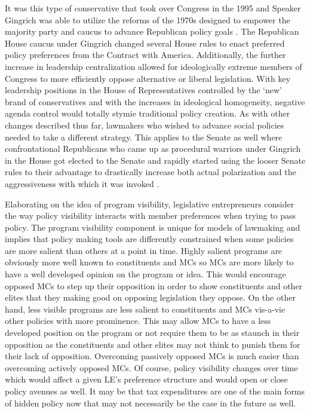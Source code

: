 \documentclass[12pt]{article}
\begin{document}
It was this type of conservative that took over Congress in the 1995 and Speaker Gingrich was able to utilize the reforms of the 1970s designed to empower the majority party and caucus to advance Republican policy goals \citep{roberts2003}. The Republican House caucus under Gingrich changed several House rules to enact preferred policy preferences from the Contract with America. Additionally, the further increase in leadership centralization allowed for ideologically extreme members of Congress to more efficiently oppose alternative or liberal legislation. With key leadership positions in the House of Representatives controlled by the `new' brand of conservatives and with the increases in ideological homogeneity, negative agenda control would totally stymie traditional policy creation. As with other changes described thus far, lawmakers who wished to advance social policies needed to take a different strategy. This applies to the Senate as well where confrontational Republicans who came up as procedural warriors under Gingrich in the House got elected to the Senate and rapidly started using the looser Senate rules to their advantage to drastically increase both actual polarization and the aggressiveness with which it was invoked \citep{lee2008, theriault2013}.

Elaborating on the idea of program visibility, legislative entrepreneurs consider the way policy visibility interacts with member preferences when trying to pass policy. The program visibility component is unique for models of lawmaking and implies that policy making tools are differently constrained when some policies are more salient than others at a point in time. Highly salient programs are obviously more well known to constituents and MCs so MCs are more likely to have a well developed opinion on the program or idea. This would encourage opposed MCs to step up their opposition in order to show constituents and other elites that they making good on opposing legislation they oppose. On the other hand, less visible programs are less salient to constituents and MCs vis-a-vie other policies with more prominence. This may allow MCs to have a less developed position on the program or not require them to be as staunch in their opposition as the constituents and other elites may not think to punish them for their lack of opposition. Overcoming passively opposed MCs is much easier than overcoming actively opposed MCs. Of course, policy visibility changes over time which would affect a given LE's preference structure and would open or close policy avenues as well. It may be that tax expenditures are one of the main forms of hidden policy now that may not necessarily be the case in the future as well. 
\end{document}
